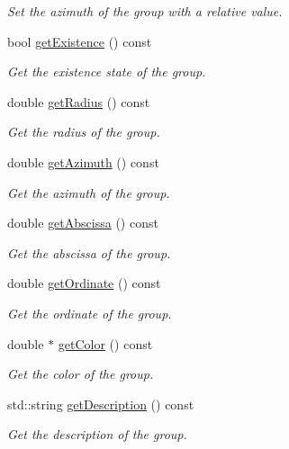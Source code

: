 \begin{DoxyCompactItemize}
\begin{DoxyCompactList}\small\item\em Set the azimuth of the group with a relative value. \end{DoxyCompactList}\item 
bool \hyperlink{class_hoa2_d_1_1_sources_group_a75f45ab02c2c3b40cdb0fd90f0d5ab4a}{get\-Existence} () const 
\begin{DoxyCompactList}\small\item\em Get the existence state of the group. \end{DoxyCompactList}\item 
double \hyperlink{class_hoa2_d_1_1_sources_group_a11c03148e95605697f7bbff2d1a0ab4c}{get\-Radius} () const 
\begin{DoxyCompactList}\small\item\em Get the radius of the group. \end{DoxyCompactList}\item 
double \hyperlink{class_hoa2_d_1_1_sources_group_abaf4f84c56a056d754921ff50314a20e}{get\-Azimuth} () const 
\begin{DoxyCompactList}\small\item\em Get the azimuth of the group. \end{DoxyCompactList}\item 
double \hyperlink{class_hoa2_d_1_1_sources_group_aed1d521703bae4061ed842068e5a1696}{get\-Abscissa} () const 
\begin{DoxyCompactList}\small\item\em Get the abscissa of the group. \end{DoxyCompactList}\item 
double \hyperlink{class_hoa2_d_1_1_sources_group_a580730da491ce6d6415aac3d27d50f8a}{get\-Ordinate} () const 
\begin{DoxyCompactList}\small\item\em Get the ordinate of the group. \end{DoxyCompactList}\item 
double $\ast$ \hyperlink{class_hoa2_d_1_1_sources_group_ab8d0c88d276863620f4c76108e0814a9}{get\-Color} () const 
\begin{DoxyCompactList}\small\item\em Get the color of the group. \end{DoxyCompactList}\item 
std\-::string \hyperlink{class_hoa2_d_1_1_sources_group_aa59a3211e20cdcee38d0d64be91de62d}{get\-Description} () const 
\begin{DoxyCompactList}\small\item\em Get the description of the group. \end{DoxyCompactList}\item 

\end{DoxyCompactItemize}
